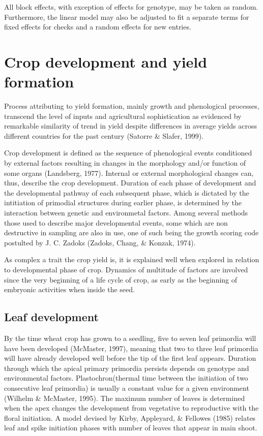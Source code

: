\documentclass[12pt,oneside]{dukestatscithesis} %
\theoremstyle{definition}
\theoremstyle{definition}
\theoremstyle{definition}
\theoremstyle{remark}
\begin{document}
All block effects, with exception of effects for genotype, may be taken
as random. Furthermore, the linear model may also be adjusted to fit a
separate terms for fixed effects for checks and a random effects for new
entries.

\section{Crop development and yield
formation}\label{crop-development-and-yield-formation}

Process attributing to yield formation, mainly growth and phenological
processes, transcend the level of inputs and agricultural sophistication
as evidenced by remarkable similarity of trend in yield despite
differences in average yields across different countries for the past
century (Satorre \& Slafer, 1999).

Crop development is defined as the sequence of phenological events
conditioned by external factors resulting in changes in the morphology
and/or function of some organs (Landsberg, 1977). Internal or external
morphological changes can, thus, describe the crop development. Duration
of each phase of development and the developmental pathway of each
subsequent phase, which is dictated by the intitiation of primodial
structures during earlier phase, is determined by the interaction
between genetic and environmetal factors. Among several methods those
used to describe major developmental events, some which are non
destructive in sampling are also in use, one of such being the growth
scoring code postulted by J. C. Zadoks (Zadoks, Chang, \& Konzak, 1974).

As complex a trait the crop yield is, it is explained well when explored
in relation to developmental phase of crop. Dynamics of multitude of
factors are involved since the very beginning of a life cycle of crop,
as early as the beginning of embryonic activities when inside the seed.

\subsection{Leaf development}\label{leaf-development}

By the time wheat crop has grown to a seedling, five to seven leaf
primordia will have been developed (McMaster, 1997), meaning that two to
three leaf primordia will have already developed well before the tip of
the first leaf appears. Duration through which the apical primary
primordia persists depends on genotype and environmental factors.
Plastochron(thermal time between the initiation of two consecutive leaf
primordia) is usually a constant value for a given environment (Wilhelm
\& McMaster, 1995). The maximum number of leaves is determined when the
apex changes the development from vegetative to reproductive with the
floral initiation. A model devised by Kirby, Appleyard, \& Fellowes
(1985) relates leaf and spike initiation phases with number of leaves
that appear in main shoot.
\end{document}
